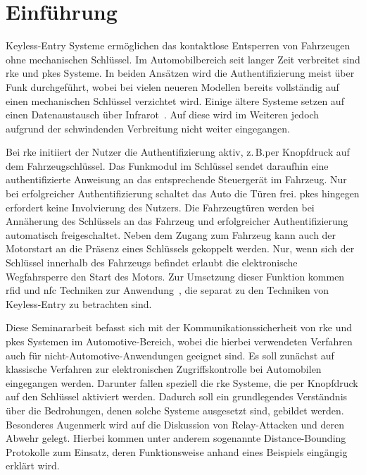 \chapter{Einführung}

\foreignlanguage{english}{Keyless-Entry} Systeme ermöglichen das kontaktlose Entsperren von Fahrzeugen ohne mechanischen Schlüssel. Im Automobilbereich seit langer Zeit verbreitet sind \gls{rke} und \gls{pkes} Systeme. In beiden Ansätzen wird die Authentifizierung meist über Funk durchgeführt, wobei bei vielen neueren Modellen bereits vollständig auf einen mechanischen Schlüssel verzichtet wird. Einige ältere Systeme setzen auf einen Datenaustausch über Infrarot~\cite{Garcia2016}. Auf diese wird im Weiteren jedoch aufgrund der schwindenden Verbreitung nicht weiter eingegangen.

Bei \gls{rke} initiiert der Nutzer die Authentifizierung aktiv, z.\,B.\@ per Knopfdruck auf dem Fahrzeugschlüssel. Das Funkmodul im Schlüssel sendet daraufhin eine authentifizierte Anweisung an das entsprechende Steuergerät im Fahrzeug. Nur bei erfolgreicher Authentifizierung schaltet das Auto die Türen frei. \gls{pkes} hingegen erfordert keine Involvierung des Nutzers. Die Fahrzeugtüren werden bei Annäherung des Schlüssels an das Fahrzeug und erfolgreicher Authentifizierung automatisch freigeschaltet. Neben dem Zugang zum Fahrzeug kann auch der Motorstart an die Präsenz eines Schlüssels gekoppelt werden. Nur, wenn sich der Schlüssel innerhalb des Fahrzeugs befindet erlaubt die elektronische Wegfahrsperre den Start des Motors. Zur Umsetzung dieser Funktion kommen \gls{rfid} und \gls{nfc} Techniken zur Anwendung~\cite{Rainer2010}, die separat zu den Techniken von \foreignlanguage{english}{Keyless-Entry} zu betrachten sind.

Diese Seminararbeit befasst sich mit der Kommunikationssicherheit von \gls{rke} und \gls{pkes} Systemen im Automotive-Bereich, wobei die hierbei verwendeten Verfahren auch für nicht-Automotive-Anwendungen geeignet sind. Es soll zunächst auf klassische Verfahren zur elektronischen Zugriffskontrolle bei Automobilen eingegangen werden. Darunter fallen speziell die \gls{rke} Systeme, die per Knopfdruck auf den Schlüssel aktiviert werden. Dadurch soll ein grundlegendes Verständnis über die Bedrohungen, denen solche Systeme ausgesetzt sind, gebildet werden. Besonderes Augenmerk wird auf die Diskussion von \foreignlanguage{english}{Relay}-Attacken und deren Abwehr gelegt. Hierbei kommen unter anderem sogenannte \foreignlanguage{english}{Distance-Bounding} Protokolle zum Einsatz, deren Funktionsweise anhand eines Beispiels eingängig erklärt wird.
